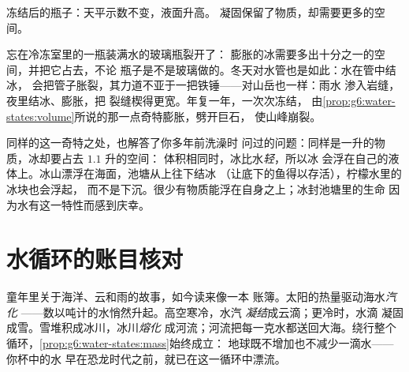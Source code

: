 \begin{omfigure}

{\small 冻结后的瓶子：天平示数不变，液面升高。
凝固保留了物质，却需要更多的空间。}
\end{omfigure}

\begin{example}[水管爆裂与山石开裂]\label{ex:g6:water-states:burst}
忘在冷冻室里的一瓶装满水的玻璃瓶裂开了：
膨胀的冰需要多出十分之一的空间，并把它占去，不论
瓶子是不是玻璃做的。冬天对水管也是如此：水在管中结冰，
会把管子胀裂，其力道不亚于一把铁锤——对山岳也一样：雨水
渗入岩缝，夜里结冰、膨胀，把
裂缝楔得更宽。年复一年，一次次冻结，
由\cref{prop:g6:water-states:volume}所说的那一点奇特膨胀，劈开巨石，
使山峰崩裂。
\end{example}

\begin{remark}[冰为什么会漂浮]\label{rem:g6:water-states:floats}
同样的这一奇特之处，也解答了你多年前洗澡时
问过的问题：同样是一升的物质，冰却要占去 $1.1$ 升的空间：
体积相同时，冰比水\emph{轻}，所以冰
会浮在自己的液体上。冰山漂浮在海面，池塘从上往下结冰
（让底下的鱼得以存活），柠檬水里的冰块也会浮起，
而不是下沉。很少有物质能浮在自身之上；冰封池塘里的生命
因为水有这一特性而感到庆幸。
\end{remark}

\section{水循环的账目核对}

\begin{example}\label{ex:g6:water-states:cycle}
童年里关于海洋、云和雨的故事，如今读来像一本
账簿。太阳的热量驱动海水\emph{汽化}
——数以吨计的水悄然升起。高空寒冷，水汽
\emph{凝结}成云滴；更冷时，水滴
凝固成雪。雪堆积成冰川，冰川\emph{熔化}
成河流；河流把每一克水都送回大海。绕行整个
循环，\cref{prop:g6:water-states:mass}始终成立：
地球既不增加也不减少一滴水——你杯中的水
早在恐龙时代之前，就已在这一循环中漂流。
\end{example}

